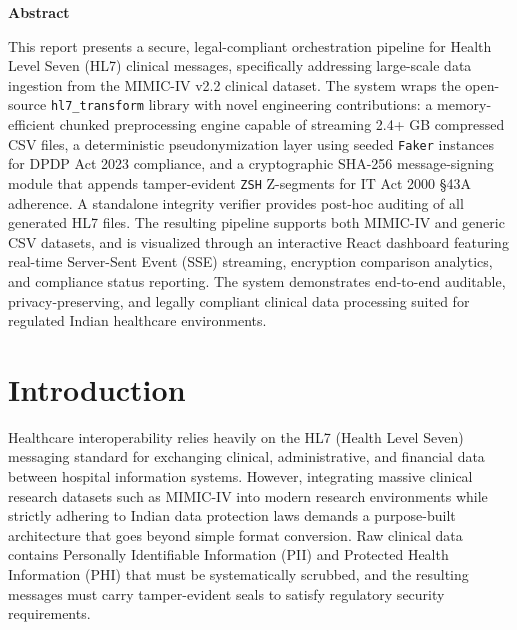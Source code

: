 \documentclass[12pt,a4paper]{report}
\begin{document}
\tableofcontents

\newpage

\listoffigures
{}

\listoftables
{}

\newpage

\begin{center}
    \textbf{Abstract}
\end{center}

This report presents a secure, legal-compliant orchestration pipeline for Health Level
Seven (HL7) clinical messages, specifically addressing large-scale data ingestion from
the MIMIC-IV v2.2 clinical dataset. The system wraps the open-source
\texttt{hl7\_transform} library with novel engineering contributions: a memory-efficient
chunked preprocessing engine capable of streaming 2.4+ GB compressed CSV files, a
deterministic pseudonymization layer using seeded \texttt{Faker} instances for
DPDP Act 2023 compliance, and a cryptographic SHA-256 message-signing module that
appends tamper-evident \texttt{ZSH} Z-segments for IT Act 2000 §43A adherence.
A standalone integrity verifier provides post-hoc auditing of all generated HL7 files.
The resulting pipeline supports both MIMIC-IV and generic CSV datasets, and is
visualized through an interactive React dashboard featuring real-time Server-Sent Event
(SSE) streaming, encryption comparison analytics, and compliance status reporting.
The system demonstrates end-to-end auditable, privacy-preserving, and legally compliant
clinical data processing suited for regulated Indian healthcare environments.

\newpage

\setcounter{section}{0}
\renewcommand{\thesection}{\arabic{section}}
\section{Introduction}

Healthcare interoperability relies heavily on the HL7 (Health Level Seven) messaging
standard for exchanging clinical, administrative, and financial data between hospital
information systems. However, integrating massive clinical research datasets such as
MIMIC-IV into modern research environments while strictly adhering to Indian data
protection laws demands a purpose-built architecture that goes beyond simple format
conversion. Raw clinical data contains Personally Identifiable Information (PII) and
Protected Health Information (PHI) that must be systematically scrubbed, and the
resulting messages must carry tamper-evident seals to satisfy regulatory security
requirements.
\end{document}

